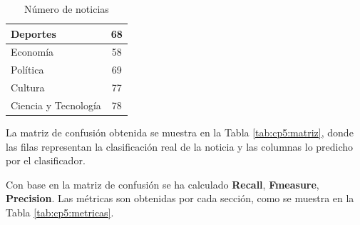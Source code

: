 \begin{enumerate}
\begin{table}[h]
\begin{tabular}{|l|c|}
    Deportes& 68\\
    \hline
    Economía& 58\\
    \hline
    Política& 69\\
    \hline
    Cultura& 77\\
    \hline
    Ciencia y Tecnología& 78\\
    \hline
      \end{tabular}
    \caption{Número de noticias}
    \label{tab:cp5:numnoticias}
  \end{table}

  La matriz de confusión obtenida se muestra en la Tabla \ref{tab:cp5:matriz}, donde las filas representan la clasificación real de la noticia y las columnas lo predicho por el clasificador. 


  \begin{table}[h]
  \centering
  \caption{Matriz de confusión}
  \label{tab:cp5:matriz}
  \end{table}

  Con base en la matriz de confusión se ha calculado \textbf{Recall}, \textbf{Fmeasure}, \textbf{Precision}. Las métricas son obtenidas por cada sección, como se muestra en la Tabla \ref{tab:cp5:metricas}.



\end{enumerate}
